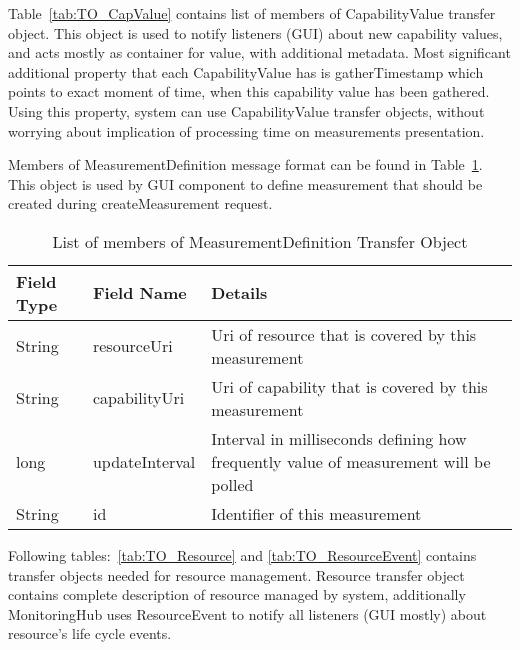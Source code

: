 Table~\ref{tab:TO_CapValue} contains list of members of CapabilityValue transfer object. This object is used to notify listeners (GUI) about new capability values, and acts mostly as container for value, with additional metadata. Most significant additional property that each CapabilityValue has is gatherTimestamp which points to exact moment of time, when this capability value has been gathered. Using this property, system can use CapabilityValue transfer objects, without worrying about implication of processing time on measurements presentation.

Members of MeasurementDefinition message format can be found in Table~\ref{tab:TO_MeasurementDef}. This object is used by GUI component to define measurement that should be created during createMeasurement request.

\begin{table}[ht] %
\begin{tabular}{| m{} | m{} | m{} |}
\hline 
\cellcolor[gray]{0.9} Field Type & \cellcolor[gray]{0.9} Field Name & \cellcolor[gray]{0.9} Details \\
\hline 
String & resourceUri & Uri of resource that is covered by this measurement \\
String & capabilityUri & Uri of capability that is covered by this measurement \\
long & updateInterval & Interval in milliseconds defining how frequently value of measurement will be polled \\
String & id & Identifier of this measurement \\ 
\hline 
\end{tabular}
\caption{List of members of MeasurementDefinition Transfer Object}
\label{tab:TO_MeasurementDef}
\end{table} %

Following tables:~\ref{tab:TO_Resource} and \ref{tab:TO_ResourceEvent} contains transfer objects needed for resource management. Resource transfer object contains complete description of resource managed by system, additionally MonitoringHub uses ResourceEvent to notify all listeners (GUI mostly) about resource's life cycle events. 

